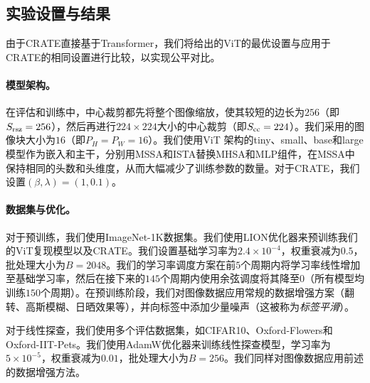 \documentclass[../../book-main_zh.tex]{subfiles}
\begin{document}
\subsection{实验设置与结果}\label{sub:image_classification_experiments}

由于CRATE直接基于Transformer，我们将\cite{dosovitskiy2020image,touvron2020training}给出的ViT的最优设置与应用于CRATE的相同设置进行比较，以实现公平对比。

\paragraph{模型架构。} 在评估和训练中，中心裁剪都先将整个图像缩放，使其较短的边长为\(256\)（即\(S_{\mathrm{rsz}} = 256\)），然后再进行\(224 \times 224\)大小的中心裁剪（即\(S_{\mathrm{cc}} = 224\)）。我们采用的图像块大小为\(16\)（即\(P_{H} = P_{W} = 16\)）。我们使用ViT \cite{dosovitskiy2020image}架构的tiny、small、base和large模型作为嵌入和主干，分别用MSSA和ISTA替换MHSA和MLP组件，在MSSA中保持相同的头数和头维度，从而大幅减少了训练参数的数量。对于CRATE，我们设置\((\beta, \lambda) = (1, 0.1)\)。

\paragraph{数据集与优化。} 对于预训练，我们使用ImageNet-1K数据集。我们使用LION优化器\citep{chen2024symbolic}来预训练我们的ViT复现模型以及CRATE。我们设置基础学习率为\(2.4 \times 10^{-4}\)，权重衰减为\(0.5\)，批处理大小为\(B = 2048\)。我们的学习率调度方案在前\(5\)个周期内将学习率线性增加至基础学习率，然后在接下来的\(145\)个周期内使用余弦调度将其降至\(0\)（所有模型均训练\(150\)个周期）。在预训练阶段，我们对图像数据应用常规的数据增强方案（翻转、高斯模糊、日晒效果等），并向标签中添加少量噪声（这被称为\textit{标签平滑}\citep{muller2019does}）。

对于线性探查，我们使用多个评估数据集，如CIFAR10、Oxford-Flowers和Oxford-IIT-Pets。我们使用AdamW优化器来训练线性探查模型，学习率为\(5 \times 10^{-5}\)，权重衰减为\(0.01\)，批处理大小为\(B = 256\)。我们同样对图像数据应用前述的数据增强方法。
\end{document}
